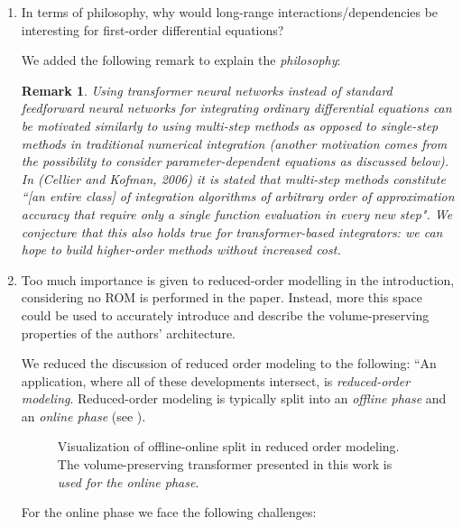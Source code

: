 \documentclass{article}
\newtheorem*{rmrk*}{Remark}
\begin{document}
\begin{enumerate}
    \item In terms of philosophy, why would long-range interactions/dependencies be interesting for first-order differential equations?
    
    {\color{mred} We added the following remark to explain the \textit{philosophy}:
    
    \begin{rmrk*} Using transformer neural networks instead of standard feedforward neural networks for \emph{integrating} ordinary differential equations can be motivated similarly to using multi-step methods as opposed to single-step methods in traditional numerical integration (another motivation comes from the possibility to consider parameter-dependent equations as discussed below). In (Cellier and Kofman, 2006) it is stated that multi-step methods constitute ``[an entire class] of integration algorithms of arbitrary order of approximation accuracy that require only a single function evaluation in every new step". We conjecture that this also holds true for transformer-based integrators: we can hope to build higher-order methods without increased cost. \end{rmrk*}
    
    }
    \item Too much importance is given to reduced-order modelling in the introduction, considering no ROM is performed in the paper. Instead, more this space could be used to accurately introduce and describe the volume-preserving properties of the authors' architecture.
        
    
    {\color{mred} We reduced the discussion of reduced order modeling to the following: ``An application, where all of these developments intersect, is \textit{reduced-order modeling}. Reduced-order modeling is typically split into an \textit{offline phase} and an \textit{online phase} (see ).

        \begin{figure}[h]
        \centering
        
        \caption{\color{mred}Visualization of offline-online split in reduced order modeling. The volume-preserving transformer presented in this work is \textit{used for the online phase}.}
        \label{fig:OfflineOnlineSplit}
        \end{figure}
        
        For the online phase we face the following challenges:
        
}
\end{enumerate}
\end{document}
